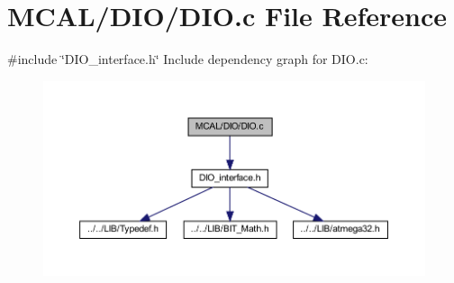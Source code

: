 \section{M\+C\+A\+L/\+D\+I\+O/\+D\+IO.c File Reference}
\label{_d_i_o_8c}
{\ttfamily \#include \char`\"{}D\+I\+O\+\_\+interface.\+h\char`\"{}}\newline
Include dependency graph for D\+I\+O.\+c\+:
\nopagebreak
\begin{figure}[H]
\begin{center}
\leavevmode
\includegraphics[width=350pt]{_d_i_o_8c__incl}
\end{center}
\end{figure}
